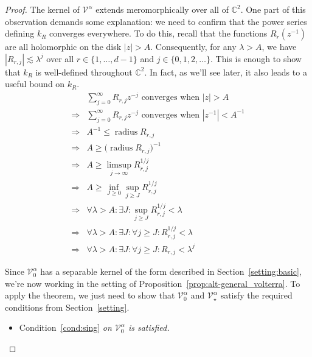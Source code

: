 \documentclass{article}
\theoremstyle{plain}
\newcommand{\C}{\mathbb{C}}
\newcommand{\volterra}{\mathcal{V}}
\newcommand{\hardpart}{\mathcal{V}_0}
\newcommand{\softpart}{\mathcal{V}_\star}
\newenvironment{verify}{\color{ForestGreen}}{\color{black}}
\begin{document}
\begin{proof}
The kernel of $\volterra^\alpha$ extends meromorphically over all of $\C^2$. One part of this observation demands some explanation: we need to confirm that the power series defining $k_R$ converges everywhere. To do this, recall that the functions $R_r(z^{-1})$ are all holomorphic on the disk $|z| > A$. Consequently, for any $\lambda > A$, we have $|R_{r,j}| \lesssim \lambda^j$ over all $r \in \{1, \ldots, d-1\}$ and $j \in \{0, 1, 2, \ldots\}$. This is enough to show that $k_R$ is well-defined throughout $\C^2$. In fact, as we'll see later, it also leads to a useful bound on $k_R$.
\begin{verify}
\begin{align*}
& \sum_{j = 0}^\infty R_{r,j} z^{-j} \text{ converges when } |z| > A \\
\Longrightarrow & \sum_{j = 0}^\infty R_{r,j} z^{-j} \text{ converges when } |z^{-1}| < A^{-1} \\
\Longrightarrow & A^{-1} \le \operatorname{radius} R_{r,j} \\
\Longrightarrow & A \ge \big(\operatorname{radius} R_{r,j}\big)^{-1} \\
\Longrightarrow & A \ge \limsup_{j \to \infty} R_{r,j}^{1/j} \\
\Longrightarrow & A \ge \inf_{J \ge 0} \sup_{j \ge J} R_{r,j}^{1/j} \\
\Longrightarrow & \forall \lambda > A: \exists J: \sup_{j \ge J} R_{r,j}^{1/j} < \lambda \\
\Longrightarrow & \forall \lambda > A: \exists J: \forall j \ge J: R_{r,j}^{1/j} < \lambda \\
\Longrightarrow & \forall \lambda > A: \exists J: \forall j \ge J: R_{r,j} < \lambda^j
\end{align*}
\end{verify}

Since $\hardpart^\alpha$ has a separable kernel of the form described in Section~\ref{setting:basic}, we're now working in the setting of Proposition~\ref{prop:alt-general_volterra}. To apply the theorem, we just need to show that $\hardpart^\alpha$ and $\softpart^\alpha$ satisfy the required conditions from Section~\ref{setting}.
\begin{itemize}
\item Condition~\eqref{cond:sing} {\em on $\hardpart^\alpha$ is satisfied.}


\end{itemize}
\end{proof}
\end{document}
